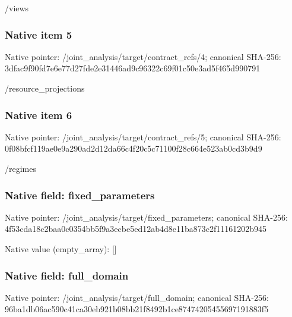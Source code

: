 \documentclass[10pt,a4paper]{article}
\begin{document}
\begingroup\raggedright\sloppy /\allowbreak{}views\par\endgroup

\subsubsection{Native item 5}
Native pointer: /joint\_\allowbreak{}analysis/target/contract\_\allowbreak{}refs/4; canonical SHA-256: 3dfac9f90fd7e6e77d27fde2e31446ad9c96322c69f01c50e3ad5f465d990791

\begingroup\raggedright\sloppy /\allowbreak{}resource\_\allowbreak{}projections\par\endgroup

\subsubsection{Native item 6}
Native pointer: /joint\_\allowbreak{}analysis/target/contract\_\allowbreak{}refs/5; canonical SHA-256: 0f08bfcf119ae0e9a290ad2d12da66c4f20c5c71100f28c664e523ab0cd3b9d9

\begingroup\raggedright\sloppy /\allowbreak{}regimes\par\endgroup

\subsubsection{Native field: fixed\_\allowbreak{}parameters}
Native pointer: /joint\_\allowbreak{}analysis/target/fixed\_\allowbreak{}parameters; canonical SHA-256: 4f53cda18c2baa0c0354bb5f9a3ecbe5ed12ab4d8e11ba873c2f11161202b945

Native value (empty\_\allowbreak{}array): []

\subsubsection{Native field: full\_\allowbreak{}domain}
Native pointer: /joint\_\allowbreak{}analysis/target/full\_\allowbreak{}domain; canonical SHA-256: 96ba1db06ac590c41ca30eb921b08bb21f8492b1ce87474205455697191883f5
\end{document}
